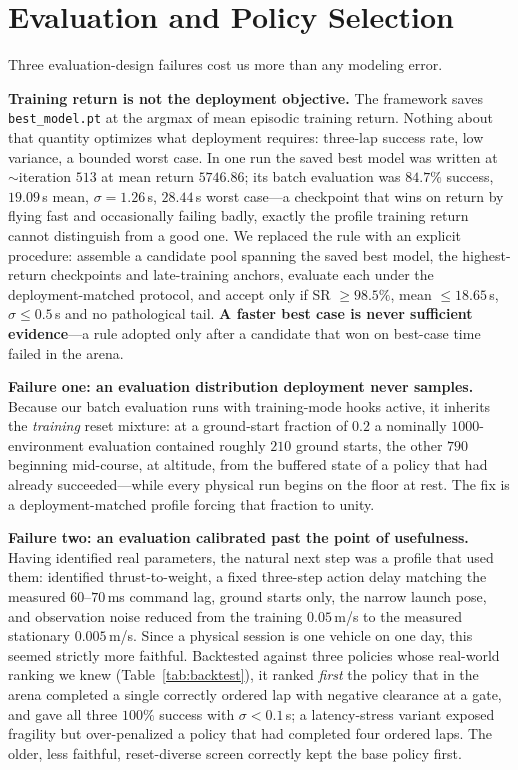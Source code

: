 \documentclass[10pt, twocolumn]{article}
\newcommand{\code}[1]{\texttt{\small #1}}
\begin{document}
\section{Evaluation and Policy Selection}
\label{sec:eval}

Three evaluation-design failures cost us more than any modeling error.

\textbf{Training return is not the deployment objective.} The framework saves
\code{best\_model.pt} at the argmax of mean episodic training return. Nothing
about that quantity optimizes what deployment requires: three-lap success rate,
low variance, a bounded worst case. In one run the saved best model was written
at ${\sim}$iteration $513$ at mean return $5746.86$; its batch evaluation was
$84.7\%$ success, $19.09$\,s mean, $\sigma = 1.26$\,s, $28.44$\,s worst
case---a checkpoint that wins on return by flying fast and occasionally failing
badly, exactly the profile training return cannot distinguish from a good one.
We replaced the rule with an explicit procedure: assemble a candidate pool
spanning the saved best model, the highest-return checkpoints and late-training
anchors, evaluate each under the deployment-matched protocol, and accept only if
SR $\geq 98.5\%$, mean $\leq 18.65$\,s, $\sigma \leq 0.5$\,s and no
pathological tail.
\textbf{A faster best case is never sufficient evidence}---a rule adopted only
after a candidate that won on best-case time failed in the arena.

\textbf{Failure one: an evaluation distribution deployment never samples.}
Because our batch evaluation runs with training-mode hooks active, it inherits
the \emph{training} reset mixture: at a ground-start fraction of $0.2$ a
nominally $1000$-environment evaluation contained roughly $210$ ground starts,
the other $790$ beginning mid-course, at altitude, from the buffered state of a
policy that had already succeeded---while every physical run begins on the floor
at rest. The fix is a deployment-matched profile forcing that fraction to
unity.

\textbf{Failure two: an evaluation calibrated past the point of usefulness.}
Having identified real parameters, the natural next step was a profile that
used them: identified thrust-to-weight, a fixed three-step action delay
matching the measured $60$--$70$\,ms command lag, ground starts only, the
narrow launch pose, and observation noise reduced from the training $0.05$\,m/s
to the measured stationary $0.005$\,m/s. Since a physical session is one
vehicle on one day, this seemed strictly more faithful. Backtested against
three policies whose real-world ranking we knew (Table~\ref{tab:backtest}), it
ranked \emph{first} the policy that in the arena completed a single correctly
ordered lap with negative clearance at a gate, and gave all three $100\%$
success with $\sigma < 0.1$\,s; a latency-stress variant exposed fragility but
over-penalized a policy that had completed four ordered laps. The older, less
faithful, reset-diverse screen correctly kept the base policy first.
\end{document}
